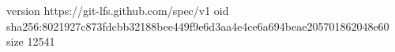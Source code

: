 version https://git-lfs.github.com/spec/v1
oid sha256:8021927c873fdcbb32188bee449f9e6d3aa4e4ce6a694beae205701862048e60
size 12541
